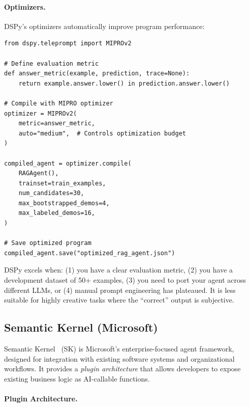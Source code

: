 \paragraph{Optimizers.}
\label{optimizers.}

DSPy’s optimizers automatically improve program performance:

\begin{lstlisting}[style=pythonstyle, caption={DSPy optimization with MIPRO}]
from dspy.teleprompt import MIPROv2

# Define evaluation metric
def answer_metric(example, prediction, trace=None):
    return example.answer.lower() in prediction.answer.lower()

# Compile with MIPRO optimizer
optimizer = MIPROv2(
    metric=answer_metric,
    auto="medium",  # Controls optimization budget
)

compiled_agent = optimizer.compile(
    RAGAgent(),
    trainset=train_examples,
    num_candidates=30,
    max_bootstrapped_demos=4,
    max_labeled_demos=16,
)

# Save optimized program
compiled_agent.save("optimized_rag_agent.json")
\end{lstlisting}

\begin{intuitionbox}
DSPy excels when: (1) you have a clear evaluation metric, (2) you have a development dataset of 50+ examples, (3) you need to port your agent across different LLMs, or (4) manual prompt engineering has plateaued. It is less suitable for highly creative tasks where the ``correct'' output is subjective.
\end{intuitionbox}

\subsection{Semantic Kernel (Microsoft)}
\label{subsubsec:semantic-kernel}

Semantic Kernel~\cite{microsoft2023semantickernel} (SK) is Microsoft’s enterprise-focused agent framework, designed for integration with existing software systems and organizational workflows. It provides a \emph{plugin architecture} that allows developers to expose existing business logic as AI-callable functions.

\paragraph{Plugin Architecture.}
\label{plugin-architecture.}

